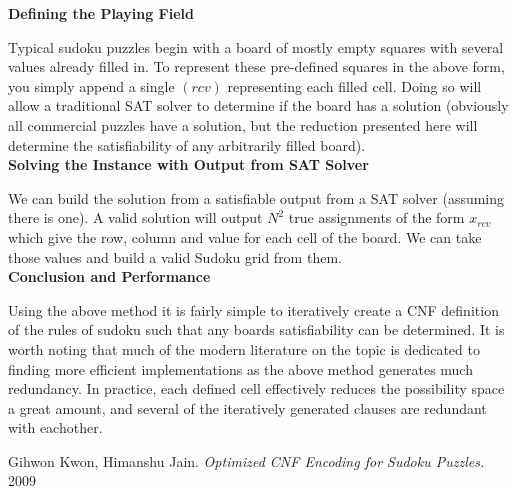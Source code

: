 \documentclass[11pt]{article}
\begin{document}
\textbf{Defining the Playing Field}

Typical sudoku puzzles begin with a board of mostly empty squares with several values already filled in. To represent these pre-defined squares in the above form, you simply append a single $(rcv)$ representing each filled cell. Doing so will allow a traditional SAT solver to determine if the board has a solution (obviously all commercial puzzles have a solution, but the reduction presented here will determine the satisfiability of any arbitrarily filled board).\\

\textbf{Solving the Instance with Output from SAT Solver}

We can build the solution from a satisfiable output from a SAT solver (assuming there is one). A valid solution will output $N^2$ true assignments of the form $x_{rcv}$ which give the row, column and value for each cell of the board. We can take those values and build a valid Sudoku grid from them.\\


\textbf{Conclusion and Performance}

Using the above method it is fairly simple to iteratively create a CNF definition of the rules of sudoku such that any boards satisfiability can be determined. It is worth noting that much of the modern literature on the topic is dedicated to finding more efficient implementations as the above method generates much redundancy. In practice, each defined cell effectively reduces the possibility space a great amount, and several of the iteratively generated clauses are redundant with eachother.




\begin{thebibliography}{9}
Gihwon Kwon, Himanshu Jain. \textit{Optimized CNF Encoding for Sudoku Puzzles.} 2009
\end{thebibliography}
\end{document}
